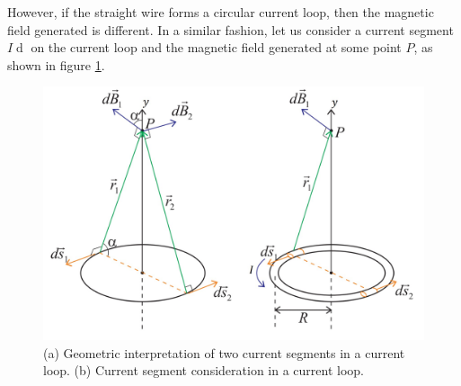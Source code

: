 However, if the straight wire forms a circular current loop, then the magnetic field generated is different. In a similar fashion, let us consider a current segment $I\mathop{\mathrm{d}\vec{s}}$ on the current loop and the magnetic field generated at some point $P$, as shown in figure \ref{fig:magnetic-field-current-loop-p-1}.

\begin{figure}[h!]
    \centering
    \includegraphics[scale=0.4]{notes/images/Magnetic-Feild-Current-Loop-P-1.JPG}
    \caption{(a) Geometric interpretation of two current segments in a current loop. (b) Current segment consideration in a current loop.}
    \label{fig:magnetic-field-current-loop-p-1}
\end{figure}
\FloatBarrier


